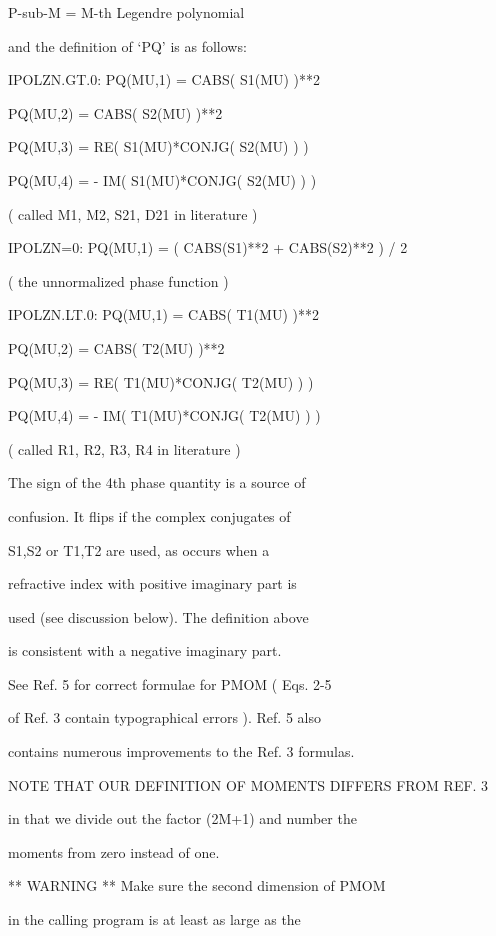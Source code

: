 \documentclass[letterpaper,10pt,english]{sphinxmanual}
\begin{document}
\begin{fulllineitems}
\begin{DUlineblock}{0em}
\begin{DUlineblock}{\DUlineblockindent}
\item[] P-sub-M = M-th Legendre polynomial
\item[] and the definition of ‘PQ’ is as follows:
\item[] IPOLZN.GT.0:  PQ(MU,1) = CABS( S1(MU) )**2
\item[] PQ(MU,2) = CABS( S2(MU) )**2
\item[] PQ(MU,3) = RE( S1(MU)*CONJG( S2(MU) ) )
\item[] PQ(MU,4) = - IM( S1(MU)*CONJG( S2(MU) ) )
\item[] ( called M1, M2, S21, D21 in literature )
\item[] IPOLZN=0:  PQ(MU,1) = ( CABS(S1)**2 + CABS(S2)**2 ) / 2
\item[] ( the unnormalized phase function )
\item[] IPOLZN.LT.0:  PQ(MU,1) = CABS( T1(MU) )**2
\item[] PQ(MU,2) = CABS( T2(MU) )**2
\item[] PQ(MU,3) = RE( T1(MU)*CONJG( T2(MU) ) )
\item[] PQ(MU,4) = - IM( T1(MU)*CONJG( T2(MU) ) )
\item[] ( called R1, R2, R3, R4 in literature )
\item[] The sign of the 4th phase quantity is a source of
\item[] confusion.  It flips if the complex conjugates of
\item[] S1,S2  or  T1,T2  are used, as occurs when a
\item[] refractive index with positive imaginary part is
\item[] used (see discussion below).  The definition above
\item[] is consistent with a negative imaginary part.
\item[] See Ref. 5 for correct formulae for PMOM ( Eqs. 2-5
\item[] of Ref. 3 contain typographical errors ).  Ref. 5 also
\item[] contains numerous improvements to the Ref. 3 formulas.
\item[] NOTE THAT OUR DEFINITION OF MOMENTS DIFFERS FROM REF. 3
\item[] in that we divide out the factor (2M+1) and number the
\item[] moments from zero instead of one.
\item[] ** WARNING **  Make sure the second dimension of PMOM
\item[] in the calling program is at least as large as the

\end{DUlineblock}
\end{DUlineblock}
\end{fulllineitems}
\end{document}
